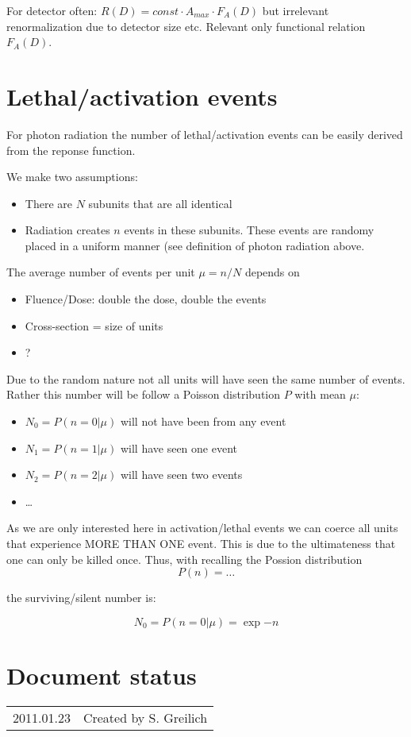 For detector often: $R(D) = const\cdot A_{max}\cdot F_A(D)$ but irrelevant
renormalization due to detector size etc. Relevant only functional relation
$F_A(D)$.


\section{Lethal/activation events}
For photon radiation the number of lethal/activation events can be easily
derived from the reponse function. 

We make two assumptions:
\begin{itemize}
  \item{There are $N$ subunits that are all identical}
  \item{Radiation creates $n$ events in these subunits. These events are
  randomy placed in a uniform manner (see definition of photon radiation above.}
\end{itemize}
The average number of events per unit $\mu = n/N$ depends on
\begin{itemize}
  \item{Fluence/Dose: double the dose, double the events}
  \item{Cross-section = size of units}
  \item{?}
\end{itemize} 

Due to the random nature not all units will have seen the same number of
events. Rather this number will be follow a Poisson distribution $P$ with mean
$\mu$:
\begin{itemize}
  \item{$N_0 = P(n=0|\mu)$ will not have been from any event}
  \item{$N_1 = P(n=1|\mu)$ will have seen one event}
  \item{$N_2 = P(n=2|\mu)$ will have seen two events}
  \item{\ldots}
\end{itemize}

As we are only interested here in activation/lethal events we can coerce all
units that experience MORE THAN ONE event. This is due to the ultimateness 
that one can only be killed once. Thus, with recalling the Possion
distribution
\begin{equation}
  P(n) =\ldots
\end{equation}

the surviving/silent number is:

\begin{equation}
  N_0 = P(n=0|\mu) = \exp{-n}
\end{equation}




\section*{Document status}
\begin{tabular}{l l}
2011.01.23&Created by S. Greilich
\end{tabular} 